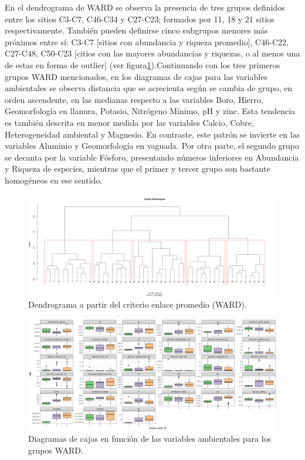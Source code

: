 \documentclass[11pt,]{article}
\begin{document}
En el dendrograma de WARD se observa la presencia de tres grupos
definidos entre los sitios C3-C7, C46-C34 y C27-C23; formados por 11, 18
y 21 sitios respectivamente. También pueden definirse cinco subgrupos
menores más próximos entre sí: C3-C7 {[}sitios con abundancia y riqueza
promedio{]}, C46-C22, C27-C48, C50-C23 {[}citios con las mayores
abundancias y riquezas, o al menos una de estas en forma de outlier{]}
(ver figura\ref{fig:denW}).Continuando con los tres primeros grupos WARD
mencionados, en los diagramas de cajas para las variables ambientales se
observa distancia que se acrecienta según se cambia de grupo, en orden
ascendente, en las medianas respecto a las variables Boro, Hierro,
Geomorfología en llanura, Potasio, Nitrógeno Mínimo, pH y zinc. Esta
tendencia es también descrita en menor medida por las variables Calcio,
Cobre, Heterogeneidad ambiental y Magnesio. En contraste, este patrón se
invierte en las variables Aluminio y Geomorfología en vaguada. Por otra
parte, el segundo grupo se decanta por la variable Fósforo, presentando
números inferiores en Abundancia y Riqueza de especies, mientras que el
primer y tercer grupo son bastante homogéneos en ese sentido.

\begin{figure}
\centering
\includegraphics[width=1.00000\textwidth]{Inter_Ward_5Clusters_Dendrogram.png}
\caption{Dendrograma a partir del criterio enlace promedio
(WARD).\label{fig:denW}}
\end{figure}

\begin{figure}
\centering
\includegraphics[width=1.00000\textwidth]{WARD_Plots_Variables_Ambientales_Clusters.png}
\caption{Diagramas de cajas en función de las variables ambientales para
los grupos WARD.\label{fig:boxW}}
\end{figure}
\end{document}
